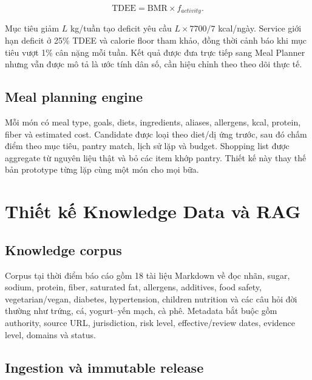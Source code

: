 \documentclass[12pt,a4paper]{report}
\begin{document}
\begin{equation}
\mathrm{TDEE}=\mathrm{BMR}\times f_{activity}.
\end{equation}

Mục tiêu giảm $L$ kg/tuần tạo deficit yêu cầu $L\times7700/7$ kcal/ngày.
Service giới hạn deficit ở 25\% TDEE và calorie floor tham khảo, đồng thời cảnh
báo khi mục tiêu vượt 1\% cân nặng mỗi tuần. Kết quả được đưa trực tiếp sang
Meal Planner nhưng vẫn được mô tả là ước tính dân số, cần hiệu chỉnh theo theo
dõi thực tế.

\section{Meal planning engine}

Mỗi món có meal type, goals, diets, ingredients, aliases, allergens, kcal,
protein, fiber và estimated cost. Candidate được loại theo diet/dị ứng trước,
sau đó chấm điểm theo mục tiêu, pantry match, lịch sử lặp và budget. Shopping
list được aggregate từ nguyên liệu thật và bỏ các item khớp pantry. Thiết kế
này thay thế bản prototype từng lặp cùng một món cho mọi bữa.

\chapter{Thiết kế Knowledge Data và RAG}

\section{Knowledge corpus}

Corpus tại thời điểm báo cáo gồm 18 tài liệu Markdown về đọc nhãn, sugar,
sodium, protein, fiber, saturated fat, allergens, additives, food safety,
vegetarian/vegan, diabetes, hypertension, children nutrition và các câu hỏi
đời thường như trứng, cá, yogurt--yến mạch, cà phê. Metadata bắt buộc gồm
authority, source URL, jurisdiction, risk level, effective/review dates,
evidence level, domains và status.

\section{Ingestion và immutable release}
\end{document}
